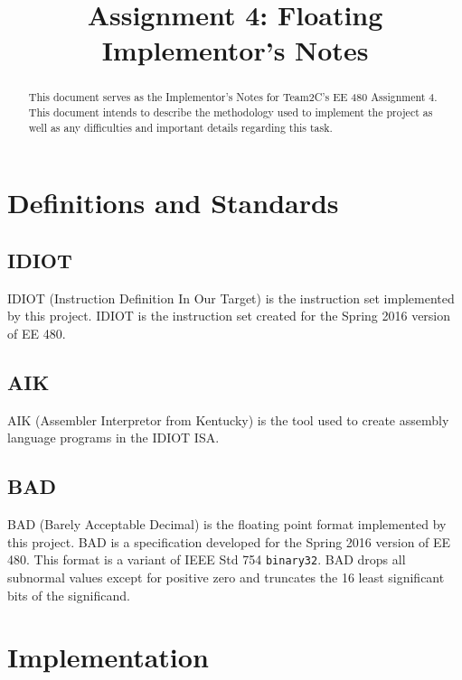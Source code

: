 \documentclass[conference]{IEEEtran}
\begin{document}
\title{Assignment 4: Floating\\Implementor's Notes}
\author{
        \IEEEauthorblockA{}
        \IEEEauthorblockA{}}

\maketitle

\begin{abstract}
This document serves as the Implementor's Notes for Team2C's EE 480 Assignment
4. This document intends to describe the methodology used to implement the 
project as well as any difficulties and important details regarding this task.
\end{abstract}

\section{Definitions and Standards}
\subsection{IDIOT}
IDIOT (Instruction Definition In Our Target) is the instruction set implemented
by this project. IDIOT is the instruction set created for the Spring 2016 
version of EE 480.\cite{idiot-isa}
\subsection{AIK}
AIK (Assembler Interpretor from Kentucky) is the tool used to create assembly
language programs in the IDIOT ISA.\cite{aik}
\subsection{BAD}
BAD (Barely Acceptable Decimal) is the floating point format implemented by
this project. BAD is a specification developed for the Spring 2016 version
of EE 480.\cite{idiot-float} This format is a variant of IEEE Std 754 
\texttt{binary32}.\cite{ieee-754} BAD drops all subnormal values except for
positive zero and truncates the 16 least significant bits of the significand.

\section{Implementation}
\end{document}
